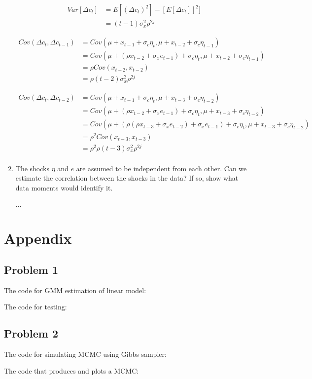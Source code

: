 \documentclass{article}
\begin{document}
\begin{enumerate}
\begin{align*}
Var[\Delta c_t] 
&= E[(\Delta c_t)^2]  - [E[\Delta c_t] ]^2]\\ 
&= (t-1)\sigma_x^2 \rho^{2j}
\end{align*}

\begin{align*}
Cov(\Delta c_t, \Delta c_{t-1}) 
&= Cov(\mu + x_{t-1} + \sigma_c \eta_{t}, \mu + x_{t-2} + \sigma_c \eta_{t-1}) \\
&= Cov(\mu + (\rho x_{t-2} + \sigma_x e_{t-1}) + \sigma_c \eta_{t}, \mu + x_{t-2} + \sigma_c \eta_{t-1}) \\
&= \rho Cov( x_{t-2} , x_{t-2}) \\
&= \rho (t-2) \sigma_x^2 \rho^{2j}
\end{align*}

\begin{align*}
Cov(\Delta c_t, \Delta c_{t-2})
&= Cov(\mu + x_{t-1} + \sigma_c \eta_{t}, \mu + x_{t-3} + \sigma_c \eta_{t-2}) \\
&= Cov(\mu + (\rho x_{t-2} + \sigma_x e_{t-1}) + \sigma_c \eta_{t}, \mu + x_{t-3} + \sigma_c \eta_{t-2}) \\
&= Cov(\mu + (\rho (\rho x_{t-3} + \sigma_x e_{t-2}) + \sigma_x e_{t-1}) + \sigma_c \eta_{t}, \mu + x_{t-3} + \sigma_c \eta_{t-2}) \\
&= \rho^2 Cov( x_{t-3} , x_{t-3}) \\
&= \rho^2 \rho (t-3) \sigma_x^2 \rho^{2j} \\
\end{align*}

\item  The shocks $\eta$ and $e$ are assumed to be independent from each other. Can we estimate the correlation between the shocks in the data? If so, show what data moments would identify it.

...

\end{enumerate}

\pagebreak

\section{Appendix}

\subsection{Problem 1}

The code for GMM estimation of linear model:



The code for testing:



\subsection{Problem 2}

The code for simulating MCMC using Gibbs sampler:



The code that produces and plots a MCMC:


\end{document}

